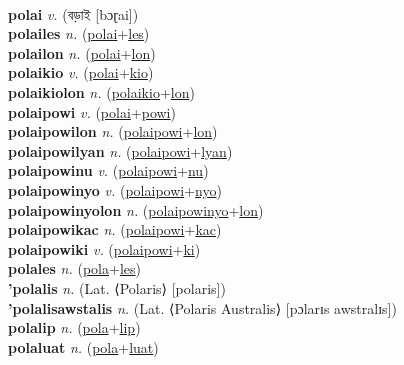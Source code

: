  \label{polaak} \\
\textbf{polai} \textit{v.} ({\bengali{}বড়াই} [bɔɽai])
 \label{polai} \\
\textbf{polailes} \textit{n.} (\hyperref[polai]{polai}+\hyperref[les]{les})
 \label{polailes} \\
\textbf{polailon} \textit{n.} (\hyperref[polai]{polai}+\hyperref[lon]{lon})
 \label{polailon} \\
\textbf{polaikio} \textit{v.} (\hyperref[polai]{polai}+\hyperref[kio]{kio})
 \label{polaikio} \\
\textbf{polaikiolon} \textit{n.} (\hyperref[polaikio]{polaikio}+\hyperref[lon]{lon})
 \label{polaikiolon} \\
\textbf{polaipowi} \textit{v.} (\hyperref[polai]{polai}+\hyperref[powi]{powi})
 \label{polaipowi} \\
\textbf{polaipowilon} \textit{n.} (\hyperref[polaipowi]{polaipowi}+\hyperref[lon]{lon})
 \label{polaipowilon} \\
\textbf{polaipowilyan} \textit{n.} (\hyperref[polaipowi]{polaipowi}+\hyperref[lyan]{lyan})
 \label{polaipowilyan} \\
\textbf{polaipowinu} \textit{v.} (\hyperref[polaipowi]{polaipowi}+\hyperref[nu]{nu})
 \label{polaipowinu} \\
\textbf{polaipowinyo} \textit{v.} (\hyperref[polaipowi]{polaipowi}+\hyperref[nyo]{nyo})
 \label{polaipowinyo} \\
\textbf{polaipowinyolon} \textit{n.} (\hyperref[polaipowinyo]{polaipowinyo}+\hyperref[lon]{lon})
 \label{polaipowinyolon} \\
\textbf{polaipowikac} \textit{n.} (\hyperref[polaipowi]{polaipowi}+\hyperref[kac]{kac})
 \label{polaipowikac} \\
\textbf{polaipowiki} \textit{v.} (\hyperref[polaipowi]{polaipowi}+\hyperref[ki]{ki})
 \label{polaipowiki} \\
\textbf{polales} \textit{n.} (\hyperref[pola]{pola}+\hyperref[les]{les})
 \label{polales} \\
\textbf{'polalis} \textit{n.} (Lat. ⟨Polaris⟩ [polaris])
 \label{'polalis} \\
\textbf{'polalisawstalis} \textit{n.} (Lat. ⟨Polaris Australis⟩ [pɔlarɪs awstralɪs])
 \label{'polalisawstalis} \\
\textbf{polalip} \textit{n.} (\hyperref[pola]{pola}+\hyperref[lip]{lip})
 \label{polalip} \\
\textbf{polaluat} \textit{n.} (\hyperref[pola]{pola}+\hyperref[luat]{luat})
 \label{polaluat} \\
